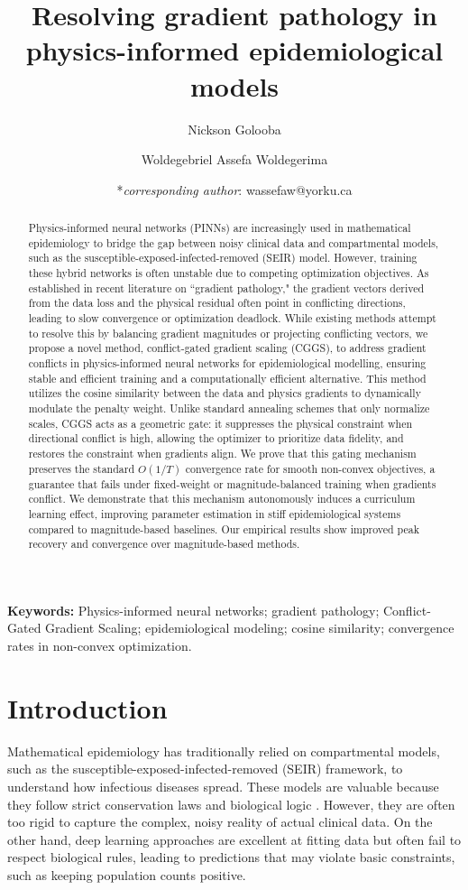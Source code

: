 \documentclass[11pt]{article}
\title{\textbf{Resolving gradient pathology in physics-informed epidemiological models}}
\author[1]{Nickson Golooba}
\author[1*]{Woldegebriel Assefa Woldegerima}
\affil[1]{Disease-informed Modeling, Methods \& Systems (DIMMS) Lab, Department of Mathematics and Statistics, York University, Toronto, Canada}
\date{*\textit{corresponding author}: wassefaw@yorku.ca}
\begin{document}
\maketitle

\begin{abstract}
Physics-informed neural networks (PINNs) are increasingly used in mathematical epidemiology to bridge the gap between noisy clinical data and compartmental models, such as the susceptible-exposed-infected-removed (SEIR) model. However, training these hybrid networks is often unstable due to competing optimization objectives. As established in recent literature on ``gradient pathology," the gradient vectors derived from the data loss and the physical residual often point in conflicting directions, leading to slow convergence or optimization deadlock. While existing methods attempt to resolve this by balancing gradient magnitudes or projecting conflicting vectors, we propose a novel method, conflict-gated gradient scaling (CGGS), to address gradient conflicts in physics-informed neural networks for epidemiological modelling, ensuring stable and efficient training and a computationally efficient alternative. This method utilizes the cosine similarity between the data and physics gradients to dynamically modulate the penalty weight. Unlike standard annealing schemes that only normalize scales, CGGS acts as a geometric gate: it suppresses the physical constraint when directional conflict is high, allowing the optimizer to prioritize data fidelity, and restores the constraint when gradients align. We prove that this gating mechanism preserves the standard $O(1/T)$ convergence rate for smooth non-convex objectives, a guarantee that fails under fixed-weight or magnitude-balanced training when gradients conflict. We demonstrate that this mechanism autonomously induces a curriculum learning effect, improving parameter estimation in stiff epidemiological systems compared to magnitude-based baselines. Our empirical results show improved peak recovery and convergence over magnitude-based methods. 
\end{abstract}
 \textbf{Keywords:} Physics-informed neural networks; gradient pathology; Conflict-Gated Gradient Scaling; epidemiological modeling; cosine similarity; convergence rates in non-convex optimization.
\section{Introduction}

Mathematical epidemiology has traditionally relied on compartmental models, such as the susceptible-exposed-infected-removed (SEIR) framework, to understand how infectious diseases spread. These models are valuable because they follow strict conservation laws and biological logic \cite{kermack1927contribution}. However, they are often too rigid to capture the complex, noisy reality of actual clinical data. On the other hand, deep learning approaches are excellent at fitting data but often fail to respect biological rules, leading to predictions that may violate basic constraints, such as keeping population counts positive.
\end{document}
